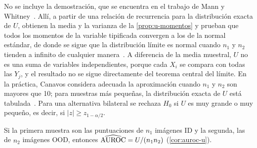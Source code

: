 No se incluye la demostración, que se encuentra en el trabajo de Mann y Whitney~\cite[sec.~4]{mann1947}. Allí, a partir de una relación de recurrencia para la distribución exacta de $U$, obtienen la media y la varianza de la \cref{prop:u-momentos} y prueban que todos los momentos de la variable tipificada convergen a los de la normal estándar, de donde se sigue que la distribución límite es normal cuando $n_1$ y $n_2$ tienden a infinito de cualquier manera~\cite[sec.~4]{mann1947}. A diferencia de la media muestral, $U$ no es una suma de variables independientes, porque cada $X_i$ se compara con todas las $Y_j$, y el resultado no se sigue directamente del teorema central del límite. En la práctica, Canavos considera adecuada la aproximación cuando $n_1$ y $n_2$ son mayores que 10; para muestras más pequeñas, la distribución exacta de $U$ está tabulada~\cite[sec.~15.2.1]{canavos2003}. Para una alternativa bilateral se rechaza $H_0$ si $U$ es muy grande o muy pequeño, es decir, si $|z| \ge z_{1-\alpha/2}$.

Si la primera muestra son las puntuaciones de $n_1$ imágenes ID y la segunda, las de $n_2$ imágenes OOD, entonces $\widehat{\mathrm{AUROC}} = U/(n_1 n_2)$ (\cref{cor:auroc-u}).

